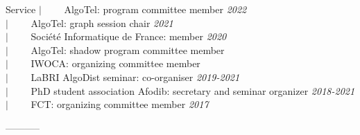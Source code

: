 \documentclass[french]{resume} %
\begin{document}
\begin{rSection}{Service} %
$| \qquad$ AlgoTel: program committee member \hfill {\em 2022} \\
$| \qquad$ AlgoTel: graph session chair \hfill {\em 2021} \\
$| \qquad$ Société Informatique de France: member \hfill {\em 2020} \\
$| \qquad$ AlgoTel: shadow program committee member \\
$| \qquad$ IWOCA: organizing committee member \\
$| \qquad$ LaBRI AlgoDist seminar: co-organiser \hfill {\em 2019-2021}\\
$| \qquad$ PhD student association Afodib: secretary and seminar organizer \hfill {\em 2018-2021}\\
$| \qquad$ FCT: organizing committee member \hfill {\em 2017}\\
\end{rSection}

%


\begin{center}
-----------
\end{center}
\end{document}
